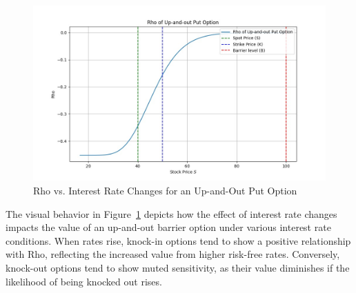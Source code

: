 \begin{figure}[h]
    \centering
    \includegraphics[width=.65\linewidth]{content/images/rho_upout.png}
    \caption{Rho vs. Interest Rate Changes for an Up-and-Out Put Option}
    \label{fig:rho_behavior}
\end{figure}

The visual behavior in Figure~\ref{fig:rho_behavior} depicts how the effect of interest rate changes impacts the value of an up-and-out barrier option under various interest rate conditions. When rates rise, knock-in options tend to show a positive relationship with Rho, reflecting the increased value from higher risk-free rates. Conversely, knock-out options tend to show muted sensitivity, as their value diminishes if the likelihood of being knocked out rises.